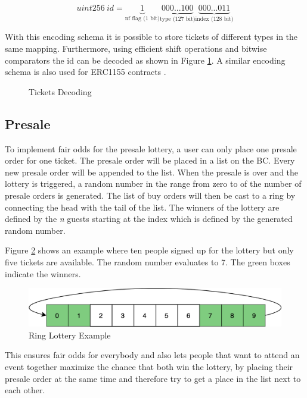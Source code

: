 \[
    uint256\ id = 
    \underbrace{1}_\text{nf flag (1 bit)}
    \underbrace{000...100}_\text{type (127 bit)}
    \underbrace{000...011}_\text{index (128 bit)}
 \]
 
With this encoding schema it is possible to store tickets of different types in the same mapping. Furthermore, using efficient shift operations and bitwise comparators the id can be decoded as shown in Figure \ref{code:tickets-decoding}. A similar encoding schema is also used for ERC1155 contracts \cite{erc1155}.


\begin{figure}[H]
    
    \caption{Tickets Decoding}
    \label{code:tickets-decoding}
\end{figure}


\subsection{Presale}\label{section:imp:presale}
To implement fair odds for the presale lottery, a user can only place one presale order for one ticket. The presale order will be placed in a list on the BC. Every new presale order will be appended to the list. When the presale is over and the lottery is triggered, a random number in the range from zero to of the number of presale orders is generated. The list of buy orders will then be cast to a ring by connecting the head with the tail of the list. The winners of the lottery are defined by the \textit{n} guests starting at the index which is defined by the generated random number.

Figure \ref{fig:ring-lottery} shows an example where ten people signed up for the lottery but only five tickets are available. The random number evaluates to 7. The green boxes indicate the winners. 

\begin{figure}[H]
    \centering
    \includegraphics[width=14cm]{images/lottery.png}
    \caption{Ring Lottery Example}
    \label{fig:ring-lottery}
\end{figure}

This ensures fair odds for everybody and also lets people that want to attend an event together maximize the chance that both win the lottery, by placing their presale order at the same time and therefore try to get a place in the list next to each other.

